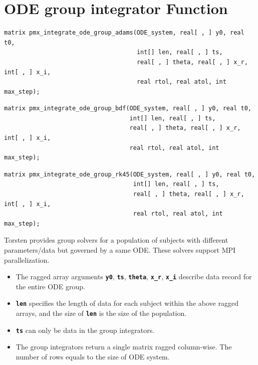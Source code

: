 \documentclass[10pt, reqno, oneside]{amsbook}
\numberwithin{equation}{chapter}
\numberwithin{figure}{chapter}
\numberwithin{table}{chapter}
\theoremstyle{remark}
\begin{document}
\section{ODE group  integrator Function}
\label{sec:org47651a7}
\begin{verbatim}
matrix pmx_integrate_ode_group_adams(ODE_system, real[ , ] y0, real t0,
                                     int[] len, real[ , ] ts,
                                     real[ , ] theta, real[ , ] x_r, int[ , ] x_i,
                                     real rtol, real atol, int max_step);
\end{verbatim}
\begin{verbatim}
matrix pmx_integrate_ode_group_bdf(ODE_system, real[ , ] y0, real t0,
                                   int[] len, real[ , ] ts,
                                   real[ , ] theta, real[ , ] x_r, int[ , ] x_i,
                                   real rtol, real atol, int max_step);
\end{verbatim}
\begin{verbatim}
matrix pmx_integrate_ode_group_rk45(ODE_system, real[ , ] y0, real t0,
                                    int[] len, real[ , ] ts,
                                    real[ , ] theta, real[ , ] x_r, int[ , ] x_i,
                                    real rtol, real atol, int max_step);
\end{verbatim}
Torsten provides group solvers for a population of subjects with different parameters/data but
governed by a same ODE. These solvers support MPI parallelization.
\begin{itemize}
\item The ragged array arguments {\small \color{MRGGreen} \texttt{\textbf{y0}}}, {\small \color{MRGGreen} \texttt{\textbf{ts}}}, {\small \color{MRGGreen} \texttt{\textbf{theta}}}, {\small \color{MRGGreen} \texttt{\textbf{x\_r}}}, {\small \color{MRGGreen} \texttt{\textbf{x\_i}}} describe data record for the
entire ODE group.
\item {\small \color{MRGGreen} \texttt{\textbf{len}}} specifies the length of data for each subject within
the above ragged arrays, and the size of {\small \color{MRGGreen} \texttt{\textbf{len}}} is the size
of the population.
\item {\small \color{MRGGreen} \texttt{\textbf{ts}}} can only be data in the group integrators.
\item The group integrators return a single matrix ragged
column-wise. The number of rows equals to the size of ODE system.
\end{itemize}
\end{document}
